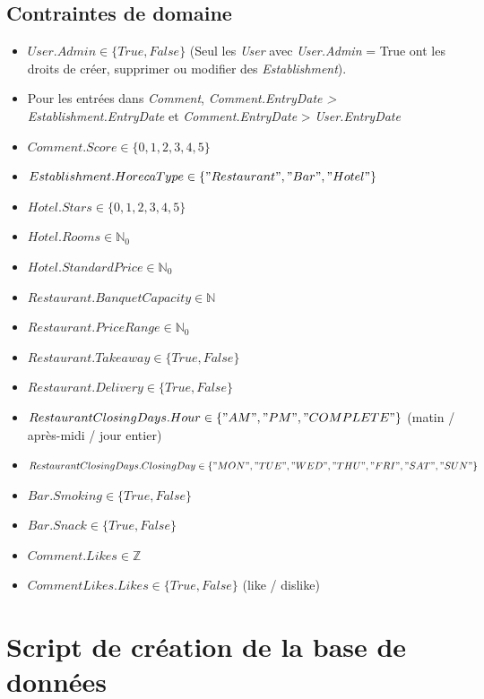 \documentclass[11pt,a4paper]{report}
\begin{document}
\subsection*{Contraintes de domaine}
\begin{itemize}
\item $User.Admin \in \{True,False\} $ (Seul les \textit{User} avec \textit{User.Admin} = True ont les droits de créer, supprimer ou modifier des \textit{Establishment}).
\item Pour les entrées dans \textit{Comment}, \textit{Comment.EntryDate > Establishment.EntryDate} et \textit{Comment.EntryDate} > \textit{User.EntryDate}
\item $Comment.Score \in \{0,1,2,3,4,5\}$
\item $Establishment.HorecaType \in \{"Restaurant", "Bar", "Hotel" \} $
\item $Hotel.Stars \in \{0,1,2,3,4,5\}$
\item $Hotel.Rooms \in \mathbb{N}_{0}$
\item $Hotel.StandardPrice \in \mathbb{N}_{0}$
\item $Restaurant.BanquetCapacity \in \mathbb{N} $
\item $Restaurant.PriceRange \in \mathbb{N}_{0}$
\item $Restaurant.Takeaway \in \{True,False\} $
\item $Restaurant.Delivery \in \{True,False\} $
\item $RestaurantClosingDays.Hour \in \{"AM","PM","COMPLETE" \}$ (matin / après-midi / jour entier)
\item $RestaurantClosingDays.ClosingDay \in \{"MON","TUE","WED","THU","FRI","SAT",\\"SUN" \} $
\item $Bar.Smoking \in \{True,False\} $
\item $Bar.Snack \in \{True,False\} $
\item $Comment.Likes \in \mathbb{Z} $
\item $CommentLikes.Likes \in \{True,False\} $ (like / dislike)

\end{itemize}

\section*{Script de création de la base de données}
\end{document}
